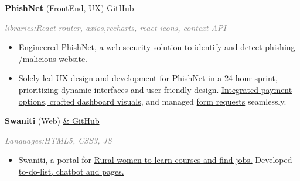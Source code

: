 \documentclass[10pt,a4paper]{resume}
\begin{document}
\textbf{PhishNet} (FrontEnd, UX) 
{\textcolor{blue}{\href{https://github.com/Altafalam3/PhishNet}{GitHub}}}


\textcolor{Gray}{\it libraries:React-router, axios,recharts, react-icons, context API}
\begin{itemize}
    \item Engineered \underline{PhishNet, a web security solution} to identify and detect phishing /malicious website.
    \item Solely led \underline{UX design and development} for PhishNet in a \underline{24-hour sprint}, prioritizing dynamic interfaces and user-friendly design. \underline{Integrated payment options, crafted dashboard visuals}, and managed \underline{form requests} seamlessly.
\end{itemize}
\textbf{Swaniti} (Web)   
\href{https://github.com/Sarahkhan20/Swaniti-PROJECT}{ & GitHub }   

\textcolor{Gray}{\it  Languages:HTML5, CSS3, JS}
\begin{itemize}
    \item Swaniti, a portal for \underline{Rural women to learn courses  and find jobs.} Developed \underline{to-do-list, chatbot and pages.}
\end{itemize}
\end{document}
